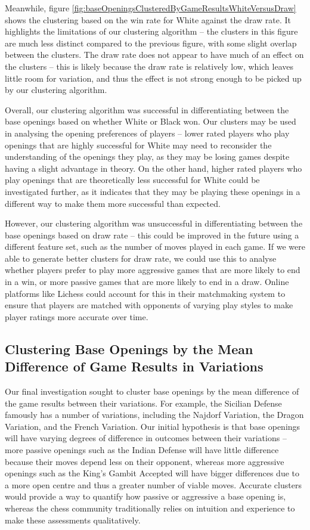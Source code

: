 \documentclass[a4paper, 11pt]{article}
\begin{document}
Meanwhile, figure \ref{fig:baseOpeningsClusteredByGameResultsWhiteVersusDraw} shows the clustering based on the win rate for White against the draw rate. It highlights the limitations of our clustering algorithm -- the clusters in this figure are much less distinct compared to the previous figure, with some slight overlap between the clusters. The draw rate does not appear to have much of an effect on the clusters -- this is likely because the draw rate is relatively low, which leaves little room for variation, and thus the effect is not strong enough to be picked up by our clustering algorithm.

Overall, our clustering algorithm was successful in differentiating between the base openings based on whether White or Black won. Our clusters may be used in analysing the opening preferences of players -- lower rated players who play openings that are highly successful for White may need to reconsider the understanding of the openings they play, as they may be losing games despite having a slight advantage in theory. On the other hand, higher rated players who play openings that are theoretically less successful for White could be investigated further, as it indicates that they may be playing these openings in a different way to make them more successful than expected.

However, our clustering algorithm was unsuccessful in differentiating between the base openings based on draw rate -- this could be improved in the future using a different feature set, such as the number of moves played in each game. If we were able to generate better clusters for draw rate, we could use this to analyse whether players prefer to play more aggressive games that are more likely to end in a win, or more passive games that are more likely to end in a draw. Online platforms like Lichess could account for this in their matchmaking system to ensure that players are matched with opponents of varying play styles to make player ratings more accurate over time.

\subsection{Clustering Base Openings by the Mean Difference of Game Results in Variations}
Our final investigation sought to cluster base openings by the mean difference of the game results between their variations. For example, the Sicilian Defense famously has a number of variations, including the Najdorf Variation, the Dragon Variation, and the French Variation. Our initial hypothesis is that base openings will have varying degrees of difference in outcomes between their variations -- more passive openings such as the Indian Defense will have little difference because their moves depend less on their opponent, whereas more aggressive openings such as the King's Gambit Accepted will have bigger differences due to a more open centre and thus a greater number of viable moves. Accurate clusters would provide a way to quantify how passive or aggressive a base opening is, whereas the chess community traditionally relies on intuition and experience to make these assessments qualitatively.
\end{document}
